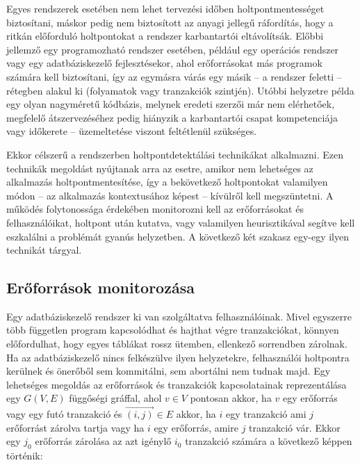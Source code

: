 Egyes rendszerek esetében nem lehet tervezési időben holtpontmentességet biztosítani, máskor pedig nem biztosított az anyagi jellegű ráfordítás, hogy a ritkán előforduló holtpontokat a rendszer karbantartói eltávolítsák. Előbbi jellemző egy programozható rendszer esetében, például egy operációs rendszer vagy egy adatbáziskezelő fejlesztésekor, ahol erőforrásokat más programok számára kell biztosítani, így az egymásra várás egy másik -- a rendszer feletti -- rétegben alakul ki (folyamatok vagy tranzakciók szintjén). Utóbbi helyzetre példa egy olyan nagyméretű kódbázis, melynek eredeti szerzői már nem elérhetőek, megfelelő átszervezéséhez pedig hiányzik a karbantartói csapat kompetenciája vagy időkerete -- üzemeltetése viszont feltétlenül szükséges.

    Ekkor célszerű a rendszerben holtpontdetektálási technikákat alkalmazni. Ezen technikák megoldást nyújtanak arra az esetre, amikor nem lehetséges az alkalmazás holtpontmentesítése, így a bekövetkező holtpontokat valamilyen módon -- az alkalmazás kontextusához képest -- kívülről kell megszüntetni. A működés folytonossága érdekében monitorozni kell az erőforrásokat és felhasználóikat, holtpont után kutatva, vagy valamilyen heurisztikával segítve kell eszkalálni a problémát gyanús helyzetben. A következő két szakasz egy-egy ilyen technikát tárgyal.

    \subsection{Erőforrások monitorozása} 
    Egy adatbáziskezelő rendszer ki van szolgáltatva felhasználóinak. Mivel egyszerre több független program kapcsolódhat és hajthat végre tranzakciókat, könnyen előfordulhat, hogy egyes táblákat rossz ütemben, ellenkező sorrendben zárolnak. Ha az adatbáziskezelő nincs felkészülve ilyen helyzetekre, felhasználói holtpontra kerülnek és önerőből sem kommitálni, sem abortálni nem tudnak majd. Egy lehetséges megoldás az erőforrások és tranzakciók kapcsolatainak reprezentálása egy $G(V, E)$ függőségi gráffal, ahol $v \in V$  pontosan akkor, ha $v$ egy erőforrás vagy egy futó tranzakció és $\overrightarrow{(i, j)} \in E$ akkor, ha $i$ egy tranzakció ami $j$ erőforrást zárolva tartja vagy ha $i$ egy erőforrás, amire $j$ tranzakció vár. Ekkor egy $j_0$ erőforrás zárolása az azt igénylő $i_0$ tranzakció számára a következő képpen történik:
    
